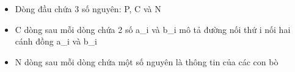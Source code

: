 \begin{itemize}
	\item     Dòng đầu chứa 3 số nguyên: P, C và N   
	\item     C dòng sau mỗi dòng chứa 2 số a\_i và b\_i mô tả đường nối thứ i nối hai cánh đồng a\_i và b\_i   
	\item     N dòng sau mỗi dòng chứa một số nguyên là thông tin của các con bò   
\end{itemize}